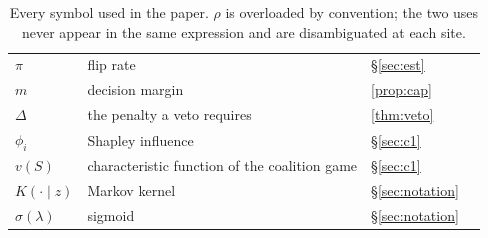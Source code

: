 \begin{table}[H]
\begin{tabular}{llll}
$\pi$ & flip rate & §\ref{sec:est} &\\
$m$ & decision margin & \cref{prop:cap} &\\
$\Delta$ & the penalty a veto requires & \cref{thm:veto} &\\
$\phi_i$ & Shapley influence & §\ref{sec:c1} &\\
$v(S)$ & characteristic function of the coalition game & §\ref{sec:c1} &\\
$K(\cdot\mid z)$ & Markov kernel & §\ref{sec:notation} &\\
$\sigma(\lambda)$ & sigmoid & §\ref{sec:notation} &\\
\bottomrule
\end{tabular}
\caption{Every symbol used in the paper. $\rho$ is overloaded by convention; the
two uses never appear in the same expression and are disambiguated at each site.}
\label{tab:symbols}
\end{table}
